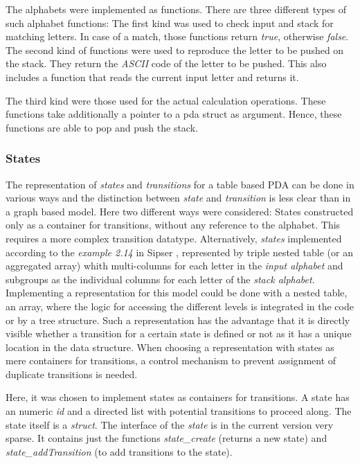 \documentclass[a4paper,11pt,twoside]{article}
\begin{document}
The alphabets were implemented as functions. There are three different
types of such alphabet functions: The first kind was used to check
input and stack for matching letters. In case of a match, those
functions return \textit{true}, otherwise \textit{false}. The second
kind of functions were used to reproduce the letter to be pushed on the
stack. They return the \textit{ASCII} code of the letter to be pushed. This
also includes a function that reads the current input letter and  
returns it.

The third kind were those used for the actual calculation
operations. These functions take additionally a pointer to a pda
struct as argument. Hence, these functions are able to pop and push
the stack. 

\subsubsection{States}
The representation of \textit{states} and \textit{transitions} for
a table based PDA can be done in various ways and the distinction
between \textit{state} and \textit{transition} is less clear than in a
graph based model. Here two different ways were considered: States
constructed only as a container for transitions, without any reference
to the alphabet. This requires a more complex transition
datatype. Alternatively, \textit{states} implemented according to 
the \textit{example 2.14} in Sipser \cite[p. 114]{sipser2012}, represented by
triple nested table (or an aggregated array) whith multi-columns for
each letter in the \textit{input alphabet} and subgroups as the 
individual columns for each letter of the \textit{stack alphabet}. Implementing
a representation for this model could be done with a nested table, an
array, where the logic for accessing the different levels is
integrated in the code or by a tree structure. Such a representation has
the advantage that it is directly visible whether a transition for a
certain state is defined or not as it has a unique location in
the data structure. When choosing a representation with states as mere
containers for transitions, a control mechanism to prevent assignment
of duplicate transitions is needed. 

Here, it was chosen to implement states as containers for
transitions. A state has an numeric \textit{id} and a directed list
with potential transitions to proceed along. The state itself is a
\textit{struct}. The interface of the \textit{state} is in the current
version very sparse. It contains just the functions
\textit{state\_create} (returns a new state) and
\textit{state\_addTransition} (to add transitions to the state).  
\end{document}
